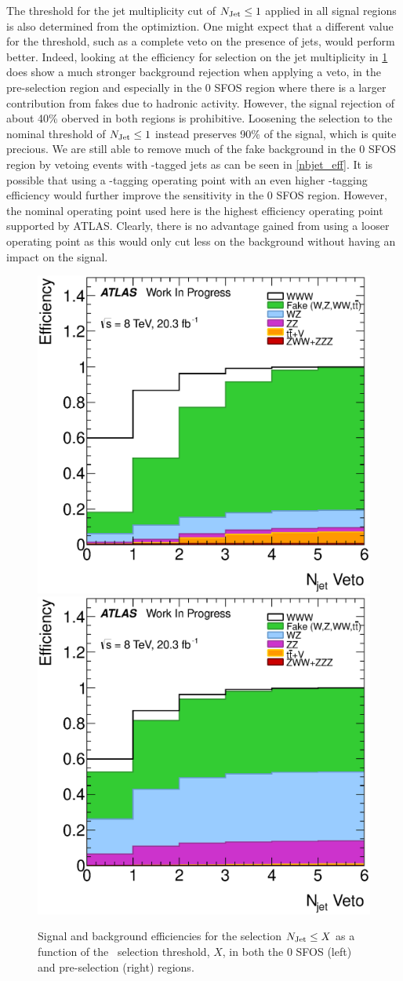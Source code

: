 The threshold for the jet multiplicity cut 
of $N_{\textrm{Jet}}\leq 1$ applied in all signal regions
is also determined from the optimiztion. One might expect
that a different value for the threshold, such as a complete
veto on the presence of jets, would perform better. 
Indeed, looking at the efficiency for selection on the jet multiplicity
in \fig\ref{fig:njet_eff} does show a much stronger background
rejection when applying a veto, in the pre-selection region
and especially in the 0 SFOS region where there is a larger
contribution from fakes due to hadronic activity.
However, the signal rejection of about 40\% oberved in both
regions is prohibitive. Loosening the selection to the nominal
threshold of $N_{\textrm{Jet}} \leq 1$ instead preserves 90\% of the signal, 
which is quite precious.  We are still able to remove 
much of the fake background in the 0 SFOS region by vetoing
events with \bee-tagged jets as can be seen in \fig\ref{nbjet_eff}.
It is possible that using a \bee-tagging operating point
with an even higher \bee-tagging efficiency would further 
improve the sensitivity in the 0 SFOS region.  However,
the nominal operating point used here is the highest 
efficiency operating point supported by ATLAS.
Clearly, there is no advantage gained from using a looser operating point
as this would only cut less on the background without having an impact
on the signal.



\begin{figure}[ht!]
\centering
\includegraphics[width=0.45\columnwidth]{figures/optimization/SignalRegionsPreselection_0SFOS_Efficiencies/NJets_LeftCumulative.eps}
\includegraphics[width=0.45\columnwidth]{figures/optimization/SignalRegions_0p5mmZ0_Preselection_Efficiencies/NJets_LeftCumulative.eps}
\caption{ Signal and background efficiencies for the selection
$N_{\textrm{Jet}} \leq X$ as a function of the \njet~selection
threshold, $X$, in both the 0 SFOS (left) and pre-selection (right) regions.  }
\label{fig:njet_eff}
\end{figure}


